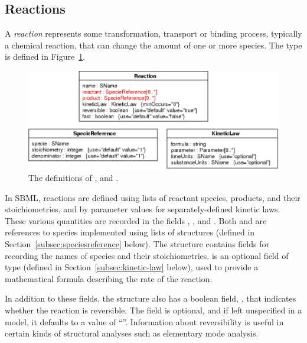 \documentclass[10pt]{cekarticle}
\newcommand{\vref}[1]{\ref{#1}}
\newcommand{\changed}[1]{\textcolor{BrickRed}{#1}}
\begin{document}
\subsection{Reactions}
\label{sec:reactions}

A \emph{reaction} represents some transformation, transport or binding
process, typically a chemical reaction, that can change the amount of one
or more species.  The  type is defined in
Figure~\vref{fig:reaction}.  

\begin{figure}[htb]
  \centering
  \vspace*{-5pt}
  \includegraphics[scale = 0.68]{reaction}
  \caption{The definitions of ,  and
    \changed{}.} 
  \label{fig:reaction}
\end{figure}

In SBML, reactions are defined using lists of reactant species, products,
and their stoichiometries, and by parameter values for separately-defined
kinetic laws.  These various quantities are recorded in the fields
, , and .  Both
 and  are references to species
implemented using lists of \changed{} structures
(defined in Section~\ref{subsec:speciesreference} below).  The
\changed{} structure contains fields for recording
the names of species and their stoichiometries.   is an
optional field of type  (defined in
Section~\ref{subsec:kinetic-law} below), used to provide a mathematical
formula describing the rate of the reaction.

In addition to these fields, the  structure also has a
boolean field, , that indicates whether the reaction is
reversible.  The field is optional, and if left unspecified in a model, it
defaults to a value of ``''.  Information about
reversibility is useful in certain kinds of structural analyses such as
elementary mode analysis.
\end{document}
